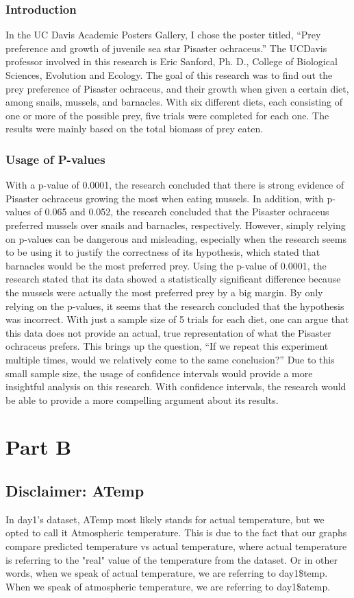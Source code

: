 \documentclass[12pt]{article}
\begin{document}
\subsubsection{Introduction}
In the UC Davis Academic Posters Gallery, I chose the poster titled, “Prey preference and growth of juvenile sea star Pisaster ochraceus.” The UCDavis professor involved in this research is Eric Sanford, Ph. D., College of Biological Sciences, Evolution and Ecology. The goal of this research was to find out the prey preference of Pisaster ochraceus, and their growth when given a certain diet, among snails, mussels, and barnacles. With six different diets, each consisting of one or more of the possible prey, five trials were completed for each one. The results were mainly based on the total biomass of prey eaten.
\subsubsection{Usage of P-values}	
With a p-value of 0.0001, the research concluded that there is strong evidence of Pisaster ochraceus growing the most when eating mussels. In addition, with p-values of 0.065 and 0.052, the research concluded that the Pisaster ochraceus preferred mussels over snails and barnacles, respectively. However, simply relying on p-values can be dangerous and misleading, especially when the research seems to be using it to justify the correctness of its hypothesis, which stated that barnacles would be the most preferred prey. Using the p-value of 0.0001, the research stated that its data showed a statistically significant difference because the mussels were actually the most preferred prey by a big margin. By only relying on the p-values, it seems that the research concluded that the hypothesis was incorrect. With just a sample size of 5 trials for each diet, one can argue that this data does not provide an actual, true representation of what the Pisaster ochraceus prefers. This brings up the question, “If we repeat this experiment multiple times, would we relatively come to the same conclusion?” Due to this small sample size, the usage of confidence intervals would provide a more insightful analysis on this research. With confidence intervals, the research would be able to provide a more compelling argument about its results.

\newpage
\section{Part B}
\subsection{Disclaimer: ATemp} \label{disclaimer}
In day1's dataset, ATemp most likely stands for actual temperature, but we opted to call it Atmospheric temperature. This is due to the fact that our graphs compare predicted temperature vs actual temperature, where actual temperature is referring to the "real" value of the temperature from the dataset. Or in other words, when we speak of actual temperature, we are referring to day1\$temp. When we speak of atmospheric temperature, we are referring to day1\$atemp.
\end{document}
